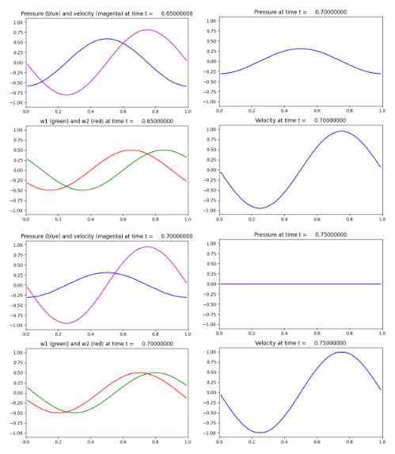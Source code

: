 \documentclass[11pt]{article}
\begin{document}
\includegraphics[width=0.475\textwidth]{frame0013fig2.png}
\vskip 10pt 
\includegraphics[width=0.475\textwidth]{frame0014fig1.png}
\includegraphics[width=0.475\textwidth]{frame0014fig2.png}
\vskip 10pt 
\includegraphics[width=0.475\textwidth]{frame0015fig1.png}
\end{document}
